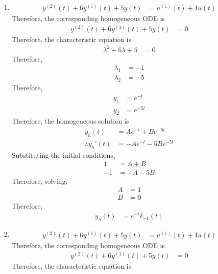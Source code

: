 \documentclass[fleqn, a4paper, 11pt, oneside]{amsart}
\theoremstyle{definition}
\theoremstyle{theorem}
\begin{document}
\begin{solution}
	\begin{enumerate}[leftmargin=*]
		\item
			\begin{align*}
				y^{(2)}(t) + 6 y^{(1)}(t) + 5 y(t) & = u^{(1)}(t) + 4 u(t)
			\end{align*}
			Therefore, the corresponding homogeneous ODE is
			\begin{align*}
				y^{(2)}(t) + 6 y^{(1)}(t) + 5 y(t) & = 0
			\end{align*}
			Therefore, the characteristic equation is
			\begin{align*}
				\lambda^2 + 6 \lambda + 5 & = 0
			\end{align*}
			Therefore,
			\begin{align*}
				\lambda_1 & = -1 \\
				\lambda_2 & = -5
			\end{align*}
			Therefore,
			\begin{align*}
				y_1 & = e^{-t} \\
				y_2 & = e^{-5 t}
			\end{align*}
			Therefore, the homogeneous solution is
			\begin{align*}
				y_h(t)               & = A e^{-t} + B e^{-5 t} \\
				\therefore {y_h}'(t) & = -A e^{-t} - 5 B e^{-5 t}
			\end{align*}
			Substituting the initial conditions,
			\begin{align*}
				1  & = A + B \\
				-1 & = -A - 5 B
			\end{align*}
			Therefore, solving,
			\begin{align*}
				A & = 1 \\
				B & = 0
			\end{align*}
			Therefore,
			\begin{align*}
				y_h(t) & = e^{-t} \delta_{-1}(t)
			\end{align*}
		\item
			\begin{align*}
				y^{(2)}(t) + 6 y^{(1)}(t) + 5 y(t) & = u^{(1)}(t) + 4 u(t)
			\end{align*}
			Therefore, the corresponding homogeneous ODE is
			\begin{align*}
				y^{(2)}(t) + 6 y^{(1)}(t) + 5 y(t) & = 0
			\end{align*}
			Therefore, the characteristic equation is
			\begin{align*}

\end{align*}
\end{enumerate}
\end{solution}
\end{document}
